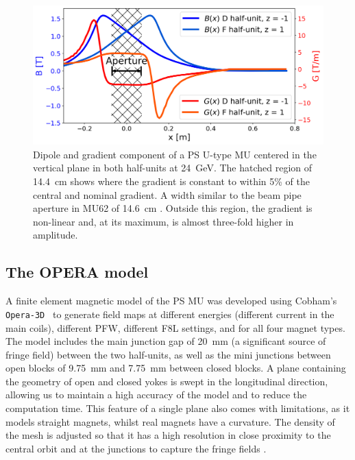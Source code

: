 \documentclass[a4paper,
               biblatex,     %
               keeplastbox,   %
               ]{jacow}
\begin{document}
\begin{figure}[!htb]
   \centering
   \includegraphics*[width=1.0\columnwidth, trim={0 0 0 0cm},clip]{MOPOTK030_f2.png}
   \caption{Dipole and gradient component of a  PS U-type MU centered in the vertical plane in both half-units at \SI{24}{GeV}. The hatched region of \SI{14.4}{cm} shows where the gradient is constant to within 5\% of the central and nominal gradient. A width similar to the beam pipe aperture in MU62 of \SI{14.6}{cm} \cite{noauthor_mu_nodate}. Outside this region, the gradient is non-linear and, at its maximum, is almost three-fold higher in amplitude.}
   \label{fig:gradient_field}
\end{figure}

\subsection{The OPERA model}
A finite element magnetic model of the PS MU was developed using Cobham's \texttt{Opera-3D}~\cite{noauthor_opera_nodate, anglada_pxmu_hrcwp_nodate} to generate field maps at different energies (different current in the main coils), different PFW, different F8L settings, and for all four magnet types. The model includes the main junction gap of \SI{20}{mm} (a significant source of fringe field) between the two half-units, as well as the mini junctions between open blocks of \SI{9.75}{mm} and \SI{7.75}{mm} between closed blocks. A plane containing the geometry of open and closed yokes is swept in the longitudinal direction, allowing us to maintain a high accuracy of the model and to reduce the computation time. This feature of a single plane also comes with limitations, as it models straight magnets, whilst real magnets have a curvature. The density of the mesh is adjusted so that it has a high resolution in close proximity to the central orbit and at the junctions to capture the fringe fields \cite{anglada_reference_2019}.
\end{document}
